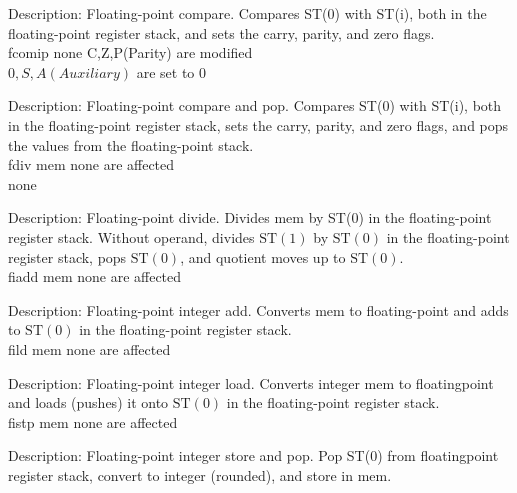 \documentclass[10pt]{book}
\begin{document}
Description: Floating-point compare. Compares ST(0) with ST(i), both in the floating-point register stack, and sets the carry, parity, and zero flags.\\
fcomip none C,Z,P(Parity) are modified\\
$0, S, A(A u x i l i a r y)$ are set to 0

Description: Floating-point compare and pop. Compares ST(0) with ST(i), both in the floating-point register stack, sets the carry, parity, and zero flags, and pops the values from the floating-point stack.\\
fdiv mem none are affected\\
none

Description: Floating-point divide. Divides mem by ST(0) in the floating-point register stack. Without operand, divides $\mathrm{ST}(1)$ by $\mathrm{ST}(0)$ in the floating-point register stack, pops $\mathrm{ST}(0)$, and quotient moves up to $\mathrm{ST}(0)$.\\
fiadd mem none are affected

Description: Floating-point integer add. Converts mem to floating-point and adds to $\mathrm{ST}(0)$ in the floating-point register stack.\\
fild mem none are affected

Description: Floating-point integer load. Converts integer mem to floatingpoint and loads (pushes) it onto $\mathrm{ST}(0)$ in the floating-point register stack.\\
fistp mem none are affected

Description: Floating-point integer store and pop. Pop ST(0) from floatingpoint register stack, convert to integer (rounded), and store in mem.
\end{document}
